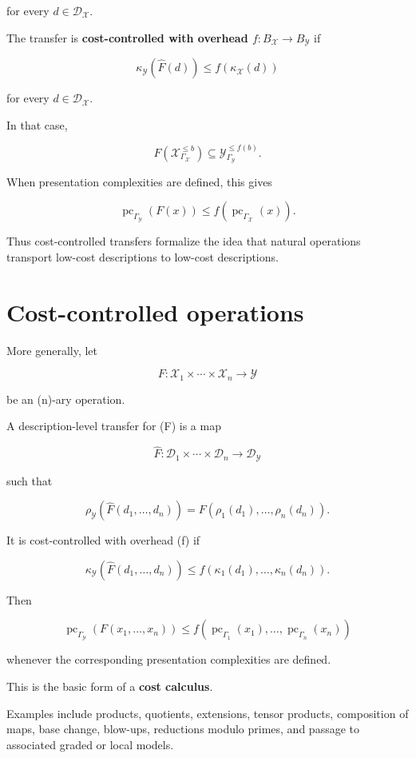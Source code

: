 \documentclass[11pt]{article}
\begin{document}
for every \(d\in\mathcal D_\mathcal X\).

The transfer is \textbf{cost-controlled with overhead \(f:B_\mathcal X\to B_\mathcal Y\)} if

\[
\kappa_\mathcal Y(\widehat F(d))
\leq
f(\kappa_\mathcal X(d))
\]

for every \(d\in\mathcal D_\mathcal X\).

In that case,

\[
F(\mathcal X_{\Gamma_\mathcal X}^{\leq b})
\subseteq
\mathcal Y_{\Gamma_\mathcal Y}^{\leq f(b)}.
\]

When presentation complexities are defined, this gives

\[
\operatorname{pc}_{\Gamma_\mathcal Y}(F(x))
\leq
f(\operatorname{pc}_{\Gamma_\mathcal X}(x)).
\]

Thus cost-controlled transfers formalize the idea that natural operations transport low-cost descriptions to low-cost descriptions.


\section{Cost-controlled operations}

More generally, let

\[
F:\mathcal X_1\times\cdots\times \mathcal X_n\to \mathcal Y
\]

be an (n)-ary operation.

A description-level transfer for (F) is a map

\[
\widehat F:
\mathcal D_1\times\cdots\times \mathcal D_n
\to
\mathcal D_\mathcal Y
\]

such that

\[
\rho_\mathcal Y(\widehat F(d_1,\dots,d_n))=F(\rho_1(d_1),\dots,\rho_n(d_n)).
\]

It is cost-controlled with overhead (f) if

\[
\kappa_\mathcal Y(\widehat F(d_1,\dots,d_n))
\leq
f(\kappa_1(d_1),\dots,\kappa_n(d_n)).
\]

Then

\[
\operatorname{pc}_{\Gamma_\mathcal Y}(F(x_1,\dots,x_n))
\leq
f(\operatorname{pc}_{\Gamma_1}(x_1),\dots,\operatorname{pc}_{\Gamma_n}(x_n))
\]

whenever the corresponding presentation complexities are defined.

This is the basic form of a \textbf{cost calculus}.

Examples include products, quotients, extensions, tensor products, composition of maps, base change, blow-ups, reductions modulo primes, and passage to associated graded or local models.
\end{document}
